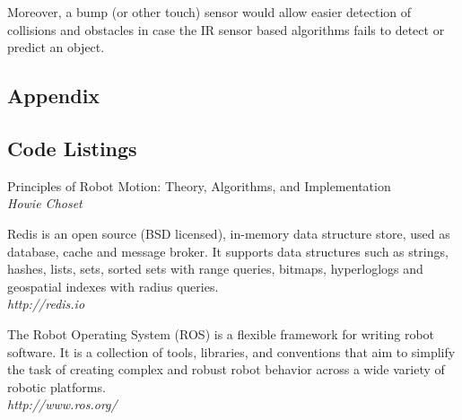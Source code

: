 \documentclass[11pt, a4paper]{article}
\begin{document}
Moreover, a bump (or other touch) sensor would allow easier detection of collisions and 
obstacles in case the IR sensor based algorithms fails to detect or predict an object.



\begin{appendices}
\section*{Appendix}
\subsection{Code Listings}




\end{appendices}


\begin{thebibliography}{2}

\par{Principles of Robot Motion: Theory, Algorithms, and Implementation}\\
\textit{Howie Choset}

\par{Redis is an open source (BSD licensed), in-memory data structure store, used as database, cache and message broker. It supports data structures such as strings, hashes, lists, sets, sorted sets with range queries, bitmaps, hyperloglogs and geospatial indexes with radius queries.}\\
\textit{http://redis.io}

\par{The Robot Operating System (ROS) is a flexible framework for writing robot software. It is a collection of tools, libraries, and conventions that aim to simplify the task of creating complex and robust robot behavior across a wide variety of robotic platforms.}\\
\textit{http://www.ros.org/}

\end{thebibliography}
\end{document}
